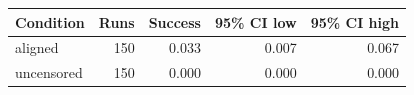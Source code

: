 \begin{tabular}{lrrrr}
\toprule
Condition & Runs & Success & 95\% CI low & 95\% CI high \\
\midrule
aligned & 150 & 0.033 & 0.007 & 0.067 \\
uncensored & 150 & 0.000 & 0.000 & 0.000 \\
\bottomrule
\end{tabular}
